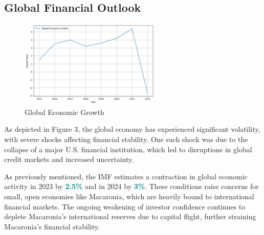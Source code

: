 \subsection*{Global Financial Outlook}

\begin{figure}[h]
     \centering
     \includegraphics[width=0.6\textwidth]{growth2.png}
     \caption{Global Economic Growth}
     \label{fig:graph_1}
\end{figure}

As depicted in Figure 3, the global economy has experienced significant volatility, with severe shocks 
affecting financial stability. One such shock was due to the collapse of a major U.S. financial institution,
which led to disruptions in global credit markets and increased uncertainty.

As previously mentioned, the IMF estimates a contraction in global economic activity in 2023 by \textcolor{teal}{\textbf{2.5\%}}
and in 2024 by \textcolor{teal}{\textbf{3\%}}. These conditions raise concerns for small, open economies like
Macaronia, which are heavily bound to international financial markets. The ongoing weakening of investor
confidence continues to deplete Macaronia's international reserves due to capital flight, further straining
Macaronia's financial stability.


